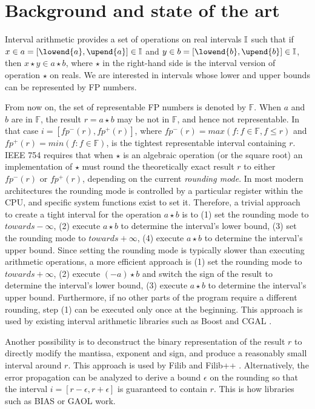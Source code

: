 \section{Background and state of the art}
\label{sec:related}

Interval arithmetic \cite{hickey2001} provides a set of operations on real intervals $\mathbb{I}$ such that if $x\in a=[\lowend{a},\upend{a}] \in \intervals$ and $y\in b=[\lowend{b},\upend{b}] \in \intervals$,
then $x \star y  \in a \star b$, where $\star$ in the right-hand side is the interval version of operation $\star$ on reals.
We are interested in intervals whose lower and upper bounds can be represented by FP numbers. 

From now on, the set of representable FP numbers is denoted by $\mathbb{F}$. When $a$ and $b$ are in $\mathbb{F}$, the result $r = a \star b$ may be not in $\mathbb{F}$, and hence not representable. In that case $i=[fp^{-}(r),fp^{+}(r)]$, where $fp^{-}(r) = max(f : f \in \mathbb{F}, f \leq r)$ and $fp^{+}(r) = min(f : f \in \mathbb{F})$, is the tightest representable interval containing $r$.
IEEE 754 requires that when $\star$ is an algebraic operation (or the square root) an implementation of $\star$ must round the theoretically exact result $r$ to either $fp^{-}(r)$ or $fp^{+}(r)$, depending on the current \emph{rounding mode}.
In most modern architectures the rounding mode is controlled by a particular register within the CPU, and specific system functions exist to set it. Therefore, a trivial approach to create a tight interval for the operation $a \star b$ is to (1) set the rounding mode to $towards -\infty$, (2) execute $a \star b$ to determine the interval's lower bound, (3) set the rounding mode to $towards +\infty$, (4) execute $a \star b$ to determine the interval's upper bound.
Since setting the rounding mode is typically slower than executing arithmetic operations, a more efficient approach is (1) set the rounding mode to $towards +\infty$, (2) execute $(-a) \star b$ and switch the sign of the result to determine the interval's lower bound, (3) execute $a \star b$ to determine the interval's upper bound. Furthermore, if no other parts of the program require a different rounding, step (1) can be executed only once at the beginning.
This approach is used by existing interval arithmetic libraries such as Boost \cite{bronnimann2006} and CGAL \cite{cgal}.

Another possibility is to deconstruct the binary representation of the result $r$ to directly modify the mantissa, exponent and sign, and produce a reasonably small interval around $r$. This approach is used by Filib and Filib++ \cite{filib}.
Alternatively, the error propagation can be analyzed to derive a bound $\epsilon$ on the rounding so that the interval $i=[r-\epsilon,r+\epsilon]$ is guaranteed to contain $r$. This is how libraries such as BIAS \cite{bias} or GAOL \cite{gaol} work.

